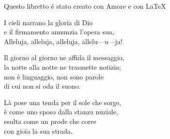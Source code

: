 \documentclass[11pt]{book}
\begin{document}
\begin{center}
{\footnotesize Questo libretto é stato creato con Amore e con \LaTeX}
\end{center}
\clearpage
\settowidth{\versewidth}{Il giorno al giorno ne affida il messaggio,}
\begin{canzone}%
\begin{ritornello}
I cieli narrano la gloria di Dio\\
e il firmamento annunzia l’opera sua,\\
Alleluja, alleluja, alleluja, allelu—u—ja!
\end{ritornello}

Il giorno al giorno ne affida il messaggio,\\
la notte alla notte ne trasmette notizia;\\
non è linguaggio, non sono parole\\
di cui non si oda il suono.

Là pose una tenda per il sole che sorge,\\
è come uno sposo dalla stanza nuziale,\\
esulta come un prode che corre\\
con gioia la sua strada.
\end{canzone}

\introduzione

\membatt
\end{document}
